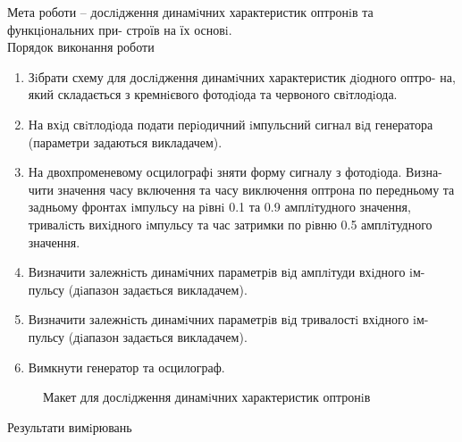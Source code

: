 \documentclass[a4paper,14pt]{extreport}
\begin{document}
\newpage
\setcounter{page}{2}
Мета роботи -- дослiдження динамiчних характеристик оптронiв та функцiональних при-
строїв на їх основi.\\

Порядок виконання роботи\\ 
\begin{enumerate}

\item Зiбрати схему для дослiдження динамiчних характеристик дiодного оптро-
на, який складається з кремнiєвого фотодiода та червоного свiтлодiода.
\item  На вхiд свiтлодiода подати перiодичний iмпульсний сигнал вiд генератора
(параметри задаються викладачем).
\item  На двохпроменевому осцилографi зняти форму сигналу з фотодiода. Визна-
чити значення часу включення та часу виключення оптрона по передньому
та задньому фронтах iмпульсу на рiвнi 0.1 та 0.9 амплiтудного значення,
тривалiсть вихiдного iмпульсу та час затримки по рiвню 0.5 амплiтудного
значення.
\item  Визначити залежнiсть динамiчних параметрiв вiд амплiтуди вхiдного iм-
пульсу (дiапазон задається викладачем).
\item  Визначити залежнiсть динамiчних параметрiв вiд тривалостi вхiдного iм-
пульсу (дiапазон задається викладачем).
\item  Вимкнути генератор та осцилограф.
\end{enumerate}

   \begin{figure}[h]
    \caption{ Макет для дослiдження динамiчних характеристик оптронiв}
    \label{ris2}
  \end{figure}


\begin{center}
Результати вимiрювань
\end{center}
\end{document}
